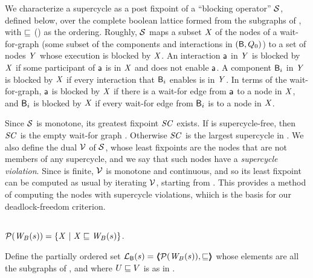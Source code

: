 We characterize a supercycle as a post fixpoint of a ``blocking operator'' $\mathcal{S}$, defined below, over the complete boolean lattice formed from the
subgraphs of , with $\sqsubseteq$ () as the ordering.
%
Roughly, $\mathcal{S}$ maps a subset $\mathit{X}$ of the nodes of a wait-for-graph (\ie some subset of the components and interactions in $(\mathsf{B}, Q_0)$)
to a set of nodes $\mathit{Y}$ whose execution is blocked by $\mathit{X}$. An interaction $\mathsf{a}$ in $\mathit{Y}$ is blocked by $\mathit{X}$ if some participant of $\mathsf{a}$ is in $\mathit{X}$ and does
not enable $\mathsf{a}$. A component $\mathsf{B}_i$  in $\mathit{Y}$ is blocked by $\mathit{X}$ if every interaction that $\mathsf{B}_i$ enables is in $\mathit{Y}$. In terms of the wait-for-graph, 
$\mathsf{a}$ is blocked by $\mathit{X}$ if there is a wait-for edge from $\mathsf{a}$ to a node in $\mathit{X}$, and $\mathsf{B}_i$ is blocked by $\mathit{X}$ if every wait-for edge from $\mathsf{B}_i$ is to a
node in $\mathit{X}$. 

Since $\mathcal{S}$ is monotone, its greatest fixpoint $\mathit{SC}$ exists.  If  is supercycle-free, then $\mathit{SC}$ is the empty wait-for graph \ewfg.
Otherwise $\mathit{SC}$ is the largest supercycle in .  We also define the dual $\mathcal{V}$ of $\mathcal{S}$, whose least fixpoints are the nodes that are not
members of any supercycle, and we say that such nodes have a \emph{supercycle violation}. Since  is finite, 
$\mathcal{V}$ is monotone and continuous, and so its least fixpoint can be computed as usual by iterating $\mathcal{V}$, starting from \ewfg.
This provides a method of computing the nodes with supercycle violations, whiich is the basis for our deadlock-freedom criterion.



\subsection{}
\label{secn:supercycle-fixpoint}

\begin{definition} \label{defn:wsetOfSubgraphs}
$\mathcal{P}(\mathit{W}_{B}({s})) = \{  \mathit{X} ~|~ \mathit{X} \sqsubseteq \mathit{W}_{B}({s})  \}$.
\end{definition}


\begin{definition} \label{defn:wflattice}
Define the partially ordered set $\mathcal{L}_{\mathsf{B}}({s}) = \langle \hspace{-0.34em} \langle \hspace{-0.34em} \langle  \mathcal{P}(\mathit{W}_{B}({s})), \sqsubseteq  \rangle \hspace{-0.34em} \rangle \hspace{-0.34em} \rangle$ %
whose elements are all the subgraphs of 
, and where  $U \sqsubseteq V$ is as in .   
\end{definition}

